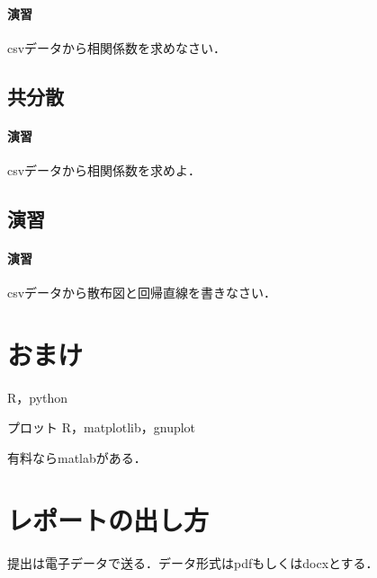 \documentclass[12pt, a4j]{jreport}
\begin{document}
\paragraph{演習}
csvデータから相関係数を求めなさい．

\subsection{共分散}

\paragraph{演習}
csvデータから相関係数を求めよ．

\subsection{演習}

\paragraph{演習}

csvデータから散布図と回帰直線を書きなさい．


\section{おまけ}
R，python

プロット
R，matplotlib，gnuplot


有料ならmatlabがある．

\section{レポートの出し方}

提出は電子データで送る．データ形式はpdfもしくはdocxとする．
\end{document}
